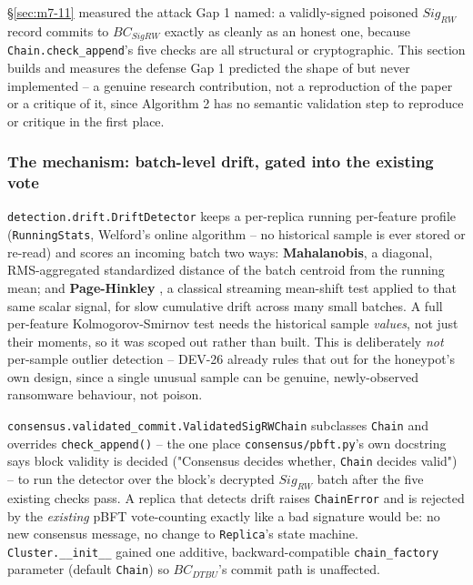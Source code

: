 \documentclass[conference]{IEEEtran}
\begin{document}
\S\ref{sec:m7-11} measured the attack Gap 1 named: a validly-signed poisoned $Sig_{RW}$ record
commits to $BC_{SigRW}$ exactly as cleanly as an honest one, because \texttt{Chain.check\_append}'s
five checks are all structural or cryptographic. This section builds and measures the defense
Gap 1 predicted the shape of but never implemented -- a genuine research contribution, not a
reproduction of the paper or a critique of it, since Algorithm 2 has no semantic validation step
to reproduce or critique in the first place.

\subsubsection{The mechanism: batch-level drift, gated into the existing vote}

\texttt{detection.drift.DriftDetector} keeps a per-replica running per-feature profile
(\texttt{RunningStats}, Welford's online algorithm \cite{welford1962} -- no historical sample is
ever stored or re-read) and scores an incoming batch two ways: \textbf{Mahalanobis}, a diagonal,
RMS-aggregated standardized distance of the batch centroid from the running mean; and
\textbf{Page-Hinkley} \cite{page1954}, a classical streaming mean-shift test applied to that same
scalar signal, for slow cumulative drift
across many small batches. A full per-feature Kolmogorov-Smirnov test needs the historical sample
\emph{values}, not just their moments, so it was scoped out rather than built. This is
deliberately \emph{not} per-sample outlier detection -- DEV-26 already rules that out for the
honeypot's own design, since a single unusual sample can be genuine, newly-observed ransomware
behaviour, not poison.

\texttt{consensus.validated\_commit.ValidatedSigRWChain} subclasses \texttt{Chain} and overrides
\texttt{check\_append()} -- the one place \texttt{consensus/pbft.py}'s own docstring says block
validity is decided ("Consensus decides whether, \texttt{Chain} decides valid") -- to run the
detector over the block's decrypted $Sig_{RW}$ batch after the five existing checks pass. A
replica that detects drift raises \texttt{ChainError} and is rejected by the \emph{existing} pBFT
vote-counting exactly like a bad signature would be: no new consensus message, no change to
\texttt{Replica}'s state machine. \texttt{Cluster.\_\_init\_\_} gained one additive,
backward-compatible \texttt{chain\_factory} parameter (default \texttt{Chain}) so $BC_{DTBU}$'s
commit path is unaffected.
\end{document}
